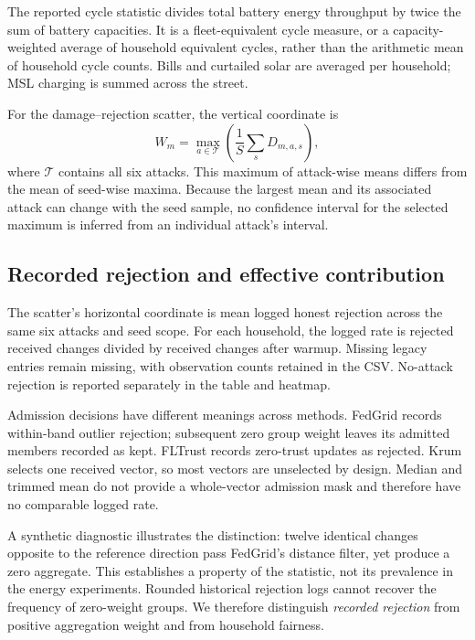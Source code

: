 The reported cycle statistic divides total battery energy throughput by twice the sum of battery capacities. It is a fleet-equivalent cycle measure, or a capacity-weighted average of household equivalent cycles, rather than the arithmetic mean of household cycle counts. Bills and curtailed solar are averaged per household; MSL charging is summed across the street.

For the damage--rejection scatter, the vertical coordinate is
\begin{equation}
W_m=\max_{a\in\mathcal T}\left(\frac{1}{S}\sum_sD_{m,a,s}\right),
\end{equation}
where $\mathcal T$ contains all six attacks. This maximum of attack-wise means differs from the mean of seed-wise maxima. Because the largest mean and its associated attack can change with the seed sample, no confidence interval for the selected maximum is inferred from an individual attack's interval.

\subsection{Recorded rejection and effective contribution}
\label{sec:participation}
The scatter's horizontal coordinate is mean logged honest rejection across the same six attacks and seed scope. For each household, the logged rate is rejected received changes divided by received changes after warmup. Missing legacy entries remain missing, with observation counts retained in the CSV. No-attack rejection is reported separately in the table and heatmap.

Admission decisions have different meanings across methods. FedGrid records within-band outlier rejection; subsequent zero group weight leaves its admitted members recorded as kept. FLTrust records zero-trust updates as rejected. Krum selects one received vector, so most vectors are unselected by design. Median and trimmed mean do not provide a whole-vector admission mask and therefore have no comparable logged rate.

A synthetic diagnostic illustrates the distinction: twelve identical changes opposite to the reference direction pass FedGrid's distance filter, yet produce a zero aggregate. This establishes a property of the statistic, not its prevalence in the energy experiments. Rounded historical rejection logs cannot recover the frequency of zero-weight groups. We therefore distinguish \emph{recorded rejection} from positive aggregation weight and from household fairness.

